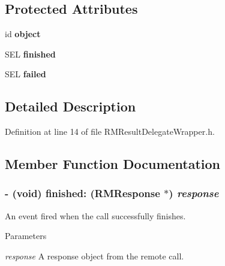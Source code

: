 \subsection*{Protected Attributes}
\begin{DoxyCompactItemize}
\item 
\hypertarget{interface_r_m_result_delegate_wrapper_aa1b393d480ecc76d9c61a2d92e40f43b}{
id {\bfseries object}}
\label{interface_r_m_result_delegate_wrapper_aa1b393d480ecc76d9c61a2d92e40f43b}

\item 
\hypertarget{interface_r_m_result_delegate_wrapper_ab76af46c7806a6326825e7522566b88b}{
SEL {\bfseries finished}}
\label{interface_r_m_result_delegate_wrapper_ab76af46c7806a6326825e7522566b88b}

\item 
\hypertarget{interface_r_m_result_delegate_wrapper_a185cef2e8baa22a03244509286ed820d}{
SEL {\bfseries failed}}
\label{interface_r_m_result_delegate_wrapper_a185cef2e8baa22a03244509286ed820d}

\end{DoxyCompactItemize}


\subsection{Detailed Description}


Definition at line 14 of file RMResultDelegateWrapper.h.

\subsection{Member Function Documentation}
\hypertarget{interface_r_m_result_delegate_wrapper_ac631e09ab641294f124b0e7d81b455c3}{
\subsubsection[{finished:}]{\setlength{\rightskip}{0pt plus 5cm}-\/ (void) finished: ({\bf RMResponse} $\ast$) {\em response}}}
\label{interface_r_m_result_delegate_wrapper_ac631e09ab641294f124b0e7d81b455c3}


An event fired when the call successfully finishes. 
\begin{DoxyParams}{Parameters}
\item[{\em response}]A response object from the remote call. \end{DoxyParams}



